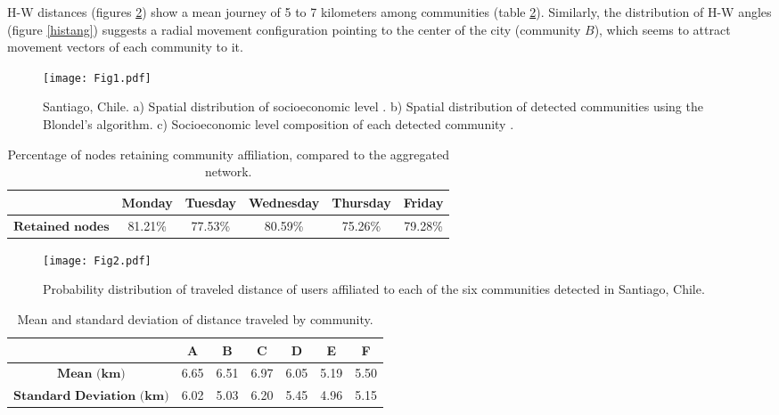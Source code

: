 \documentclass[%
preprint,
 amsmath,amssymb,
pra,
]{revtex4-1}
\begin{document}
H-W distances (figures \ref{histdist}) show a mean journey of  5 to 7 kilometers among communities (table \ref{DIST}).  Similarly, the distribution of H-W angles (figure \ref{histang}) suggests a radial movement configuration pointing to the center of the city (community $B$), which seems to attract movement vectors of each community to it. 

\begin{figure}[h]
  \raggedleft
      \texttt{[image: Fig1.pdf]}
  \caption{Santiago, Chile. a) Spatial distribution of socioeconomic level \cite{}. b) Spatial distribution of detected communities using the Blondel's algorithm. c) Socioeconomic level composition of each detected community .}
  \label{mapastgo}
\end{figure}

\begin{table}
  \begin{tabular}{c|ccccc}
      & \textbf{Monday} & \textbf{Tuesday} & \textbf{Wednesday} & \textbf{Thursday} & \textbf{Friday}\\
      \hline
      $\textbf{Retained nodes}$ & 81.21\% & 77.53\% & 80.59\% & 75.26\% & 79.28\% \\[1mm]
  \end{tabular}
  \caption{\label{tab:Sens} Percentage of nodes retaining  community affiliation, compared to the aggregated network.}
\end{table}


\begin{figure}
  \centering
      \texttt{[image: Fig2.pdf]}
  \caption{Probability distribution of traveled distance of users affiliated to  each of the six communities detected in Santiago, Chile.}
 \label{histdist}
\end{figure}

\begin{table}
  \begin{tabular}{c|cccccc}
      & \textbf{A} & \textbf{B} & \textbf{C} & \textbf{D} & \textbf{E} & \textbf{F} \\ 
      \hline
      $\textbf{Mean (km)}$ & 6.65 & 6.51 & 6.97 & 6.05 & 5.19 & 5.50 \\[1mm]
      $\textbf{Standard Deviation (km)}$ & 6.02 & 5.03 & 6.20 & 5.45 & 4.96 & 5.15 \\[1mm]
  \end{tabular}
  \caption{\label{DIST} Mean and standard deviation of distance traveled by community.}
\end{table}
\end{document}
